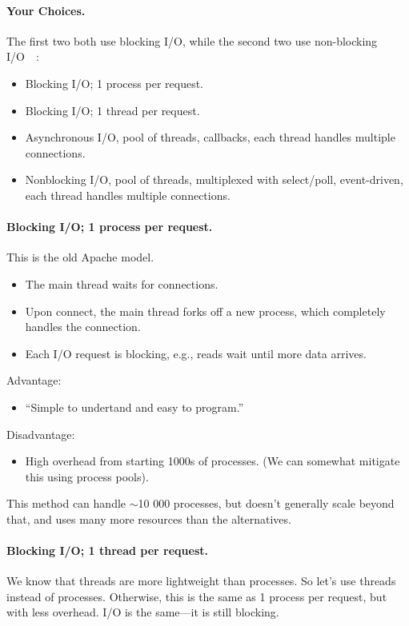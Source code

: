 \paragraph{Your Choices.} The first two both use blocking I/O, while the second two use
non-blocking I/O~~\cite{gplus:concurrent}:
    \begin{itemize}
      \item Blocking I/O; 1 process per request.
      \item Blocking I/O; 1 thread per request.
      \item Asynchronous I/O, pool of threads, callbacks, each thread handles multiple connections.
      \item Nonblocking I/O, pool of threads, multiplexed with select/poll,
        event-driven, each thread handles multiple connections.
    \end{itemize}

\paragraph{Blocking I/O; 1 process per request.}
This is the old Apache model.
  \begin{itemize}
    \item The main thread waits for connections.
    \item Upon connect, the main thread forks off a new process, which completely
      handles the connection.
    \item Each I/O request is blocking, e.g., reads wait until more data arrives.
  \end{itemize}

Advantage: 
  \begin{itemize}
    \item ``Simple to undertand and easy to program.''
  \end{itemize}

Disadvantage:
  \begin{itemize}
    \item High overhead from starting 1000s of processes.
      (We can somewhat mitigate this using process pools).
  \end{itemize}
This method can handle $\sim$10 000 processes, but doesn't generally scale beyond that, and
uses many more resources than the alternatives.

\paragraph{Blocking I/O; 1 thread per request.}
    We know that threads are more lightweight than processes. So let's use threads instead
of processes. Otherwise, this is the same as 1 process per request, but with less overhead.
I/O is the same---it is still blocking.

